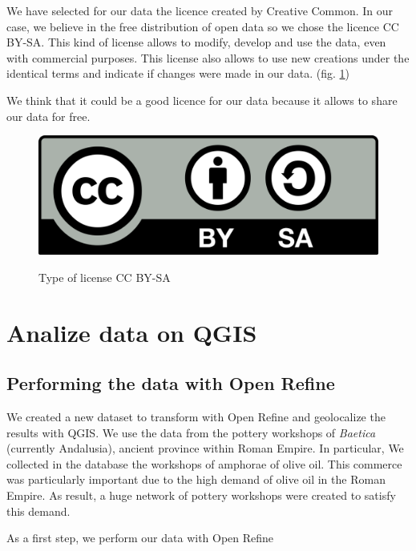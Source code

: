 \documentclass[10pt,a4paper]{article}
\begin{document}
We have selected for our data the licence created by Creative Common. In our case, we believe in the free distribution of open data so we chose the licence CC BY-SA. This kind of license allows to modify, develop and use the data, even with commercial purposes. This license also allows to use new creations under the identical terms and indicate if changes were made in our data. (fig. \ref{licence})

We think that it could be a good licence for our data because it allows to share our data for free. 

\begin{figure}[hdp]
\centering
\includegraphics[scale=0.15]{licence.png}
\label{licence}
\caption{Type of license CC BY-SA}
\end{figure}


\section{Analize data on QGIS}

\subsection{Performing the data with Open Refine}

We created a new dataset to transform with Open Refine and geolocalize the results with QGIS. We use the data from the pottery workshops of \emph{Baetica} (currently Andalusia), ancient province within Roman Empire. In particular, We collected in the database the workshops of amphorae of olive oil. This commerce was particularly important due to the high demand of olive oil in the Roman Empire. As result, a huge network of pottery workshops were created to satisfy this demand. 

As a first step, we perform our data with Open Refine
\end{document}
